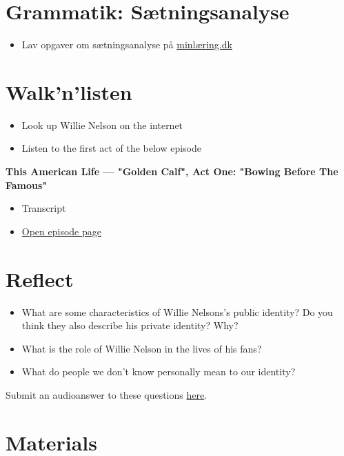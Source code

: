 \documentclass[11pt,a4paper,oneside]{book}
\begin{document}
\section*{Grammatik: Sætningsanalyse}

\begin{itemize}
\item Lav opgaver om sætningsanalyse på \href{https://app.minlaering.dk/lektier?vis=411995}{minlæring.dk}
\end{itemize}

\section*{Walk'n'listen}

\begin{itemize}
\item Look up Willie Nelson on the internet
\item Listen to the first act of the below episode
\end{itemize}
\textbf{This American Life — "Golden Calf", Act One: "Bowing Before The Famous"}


\begin{itemize}
\item Transcript
\item \href{https://www.thisamericanlife.org/185/golden-calf/act-one-0}{Open episode page}
\end{itemize}

\section*{Reflect}

\begin{itemize}
\item What are some characteristics of Willie Nelsons's public identity? Do you think they also describe his private identity? Why?
\item What is the role of Willie Nelson in the lives of his fans?
\item What do people we don't know personally mean to our identity?
\end{itemize}
Submit an audioanswer to these questions \href{https://app.edaptio.com/groups/857421/courses/61482/lesson/278058}{here}.


\section*{Materials}
\end{document}
